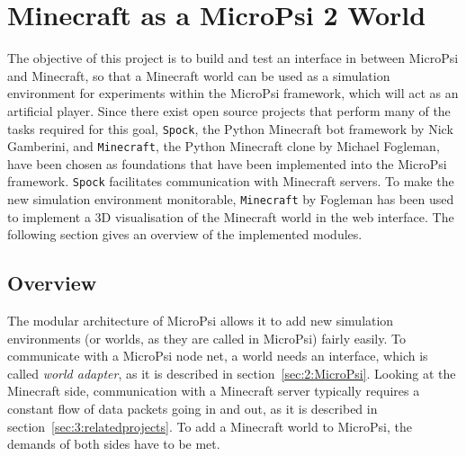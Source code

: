 \chapter{Minecraft as a MicroPsi 2 World}
\label{chap:4}
The objective of this project is to build and test an interface in between MicroPsi and Minecraft, so that a Minecraft world can be used as a simulation environment for experiments within the MicroPsi framework, which will act as an artificial player. Since there exist open source projects that perform many of the tasks required for this goal, \texttt{Spock}, the Python Minecraft bot framework by Nick Gamberini, and \texttt{Minecraft}, the Python Minecraft clone by Michael Fogleman, have been chosen as foundations that have been implemented into the MicroPsi framework. \texttt{Spock} facilitates communication with Minecraft servers. To make the new simulation environment monitorable, \texttt{Minecraft} by Fogleman has been used to implement a 3D visualisation of the Minecraft world in the web interface. The following section gives an overview of the implemented modules.

\section{Overview}



The modular architecture of MicroPsi allows it to add new simulation environments (or worlds, as they are called in MicroPsi) fairly easily. To communicate with a MicroPsi node net, a world needs an interface, which is called \emph{world adapter}, as it is described in section~\ref{sec:2:MicroPsi}. Looking at the Minecraft side, communication with a Minecraft server typically requires a constant flow of data packets going in and out, as it is described in section~\ref{sec:3:relatedprojects}. To add a Minecraft world to MicroPsi, the demands of both sides have to be met.

